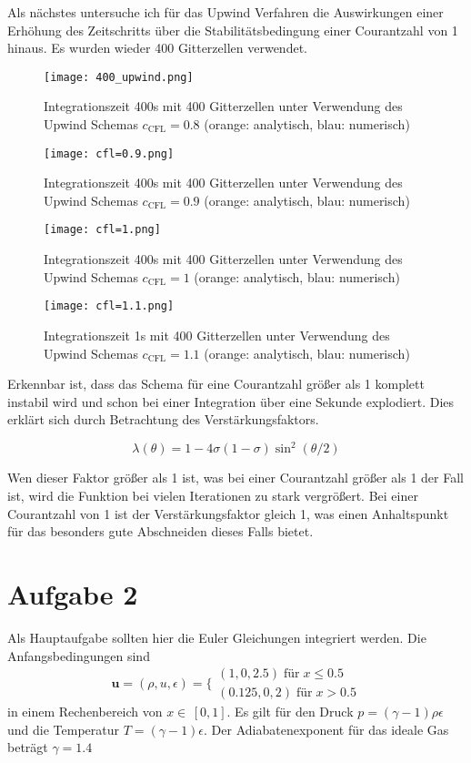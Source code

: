 \documentclass[12pt]{article}
\begin{document}
Als nächstes untersuche ich für das Upwind Verfahren die Auswirkungen einer Erhöhung des Zeitschritts über die Stabilitätsbedingung einer Courantzahl von 1 hinaus. Es wurden wieder 400 Gitterzellen verwendet.

\begin{figure}[H]\centering\texttt{[image: 400\_upwind.png]}\caption{Integrationszeit 400s mit 400 Gitterzellen unter Verwendung des Upwind Schemas $c_\text{CFL}=0.8$  (orange: analytisch, blau: numerisch)}\end{figure}

\begin{figure}[H]\centering\texttt{[image: cfl=0.9.png]}\caption{Integrationszeit 400s mit 400 Gitterzellen unter Verwendung des Upwind Schemas $c_\text{CFL}=0.9$  (orange: analytisch, blau: numerisch)}\end{figure}
\begin{figure}[H]\centering\texttt{[image: cfl=1.png]}\caption{Integrationszeit 400s mit 400 Gitterzellen unter Verwendung des Upwind Schemas $c_\text{CFL}=1$  (orange: analytisch, blau: numerisch)}\end{figure}
\begin{figure}[H]\centering\texttt{[image: cfl=1.1.png]}\caption{Integrationszeit 1s mit 400 Gitterzellen unter Verwendung des Upwind Schemas $c_\text{CFL}=1.1$  (orange: analytisch, blau: numerisch)}\end{figure}

 Erkennbar ist, dass das Schema für eine Courantzahl größer als 1 komplett instabil wird und schon bei einer Integration über eine Sekunde explodiert. Dies erklärt sich durch Betrachtung des Verstärkungsfaktors.
 
 $$\lambda(\theta)=1-4\sigma(1-\sigma)\sin^2(\theta/2)$$
 
 Wen dieser Faktor größer als 1 ist, was bei einer Courantzahl größer als 1 der Fall ist, wird die Funktion bei vielen Iterationen zu stark vergrößert. Bei einer Courantzahl von 1 ist der Verstärkungsfaktor gleich 1, was einen Anhaltspunkt für das besonders gute Abschneiden dieses Falls bietet.
 

\section{Aufgabe 2}

Als Hauptaufgabe sollten hier die Euler Gleichungen integriert werden. Die Anfangsbedingungen sind
$$\textbf{u}=(\rho,u,\epsilon)=\biggl\{\begin{array}{l}(1,0,2.5)\;\text{für}\;x\leq0.5\\(0.125,0,2)\;\text{für}\;x>0.5\end{array}$$
in einem Rechenbereich von $x\in\,[0,1]$.
Es gilt für den Druck $p=(\gamma-1)\rho\epsilon$ und die Temperatur $T=(\gamma-1)\epsilon$. Der Adiabatenexponent für das ideale Gas beträgt $\gamma=1.4$
\end{document}
